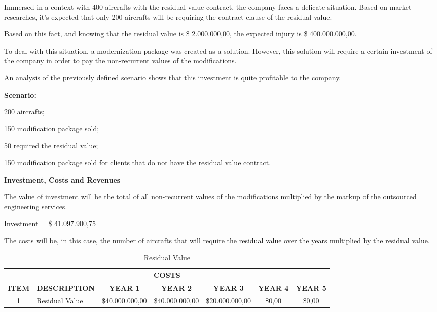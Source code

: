 Immersed in a context with 400 aircrafts with the residual value contract, the company faces a delicate situation. Based on market researches, it's expected that only 200 aircrafts will be requiring the contract clause of the residual value.

Based on this fact, and knowing that the residual value is \$ 2.000.000,00, the expected injury is \$ 400.000.000,00.

To deal with this situation, a modernization package was created as a solution. However, this solution will require a certain investment of the company in order to pay the non-recurrent values of the modifications.

An analysis of the previously defined scenario shows that this investment is quite profitable to the company.

\textbf{Scenario:}

200 aircrafts;

150 modification package sold;

50 required the residual value;

150 modification package sold for clients that do not have the residual value contract.

\textbf{Investment, Costs and Revenues}

The value of investment will be the total of all non-recurrent values of the modifications multiplied by the markup of the outsourced engineering services.

Investment = \$ 41.097.900,75

The costs will be, in this case, the number of aircrafts that will require the residual value over the years multiplied by the residual value.

\begin{table}[H]
  \scriptsize
  \centering
  \caption{Residual Value}
    \begin{tabular}{crccccc}
    \toprule
    \multicolumn{7}{c}{\textbf{COSTS}} \\
    \midrule
    \textbf{ITEM} & \multicolumn{1}{c}{\textbf{DESCRIPTION}} & \textbf{YEAR 1} & \textbf{YEAR 2} & \textbf{YEAR 3} & \textbf{YEAR 4} & \textbf{YEAR 5} \\
    1     & \multicolumn{1}{l}{Residual Value} & \$40.000.000,00 & \$40.000.000,00 & \$20.000.000,00 & \$0,00 & \$0,00 \\
    \bottomrule
    \end{tabular}%
  \label{tab:financeCostResidualValue}%
\end{table}%

